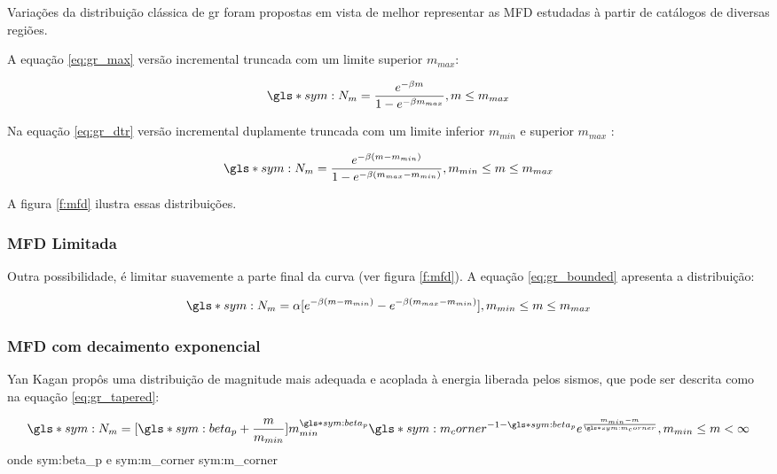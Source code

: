 Variações da distribuição clássica de \gls{gr} foram propostas em vista de melhor representar as MFD estudadas à partir de
catálogos de diversas regiões.

A equação \ref{eq:gr_max} versão incremental truncada com um limite superior $m_{max}$:

\begin{equation}
		\gls*{sym:N_m} = \frac{e^{-\beta m}}{1 -e^{-\beta m_{max}} }, m \leq m_{max}
	\label{eq:gr_max}
\end{equation}

Na equação \ref{eq:gr_dtr} versão incremental duplamente truncada com um limite inferior $m_{min}$ e superior $m_{max}$ :

\begin{equation}
		\gls*{sym:N_m} = \frac{e^{-\beta (m - m_{min})}}{1 -e^{-\beta (m_{max} - m_{min}) } } , m_{min} \leq m \leq m_{max}
	\label{eq:gr_dtr}
\end{equation}

A figura \ref{f:mfd} ilustra essas distribuições.

\subsubsection{MFD Limitada}
\label{sec:BMFD}

Outra possibilidade, é limitar suavemente a parte final da curva (ver figura \ref{f:mfd}). A equação \ref{eq:gr_bounded} apresenta
a distribuição:

\begin{equation}
		\gls*{sym:N_m} = \alpha [ e^{-\beta (m - m_{min})} - e^{-\beta (m_{max} - m_{min}) } ], m_{min} \leq m \leq m_{max}
	\label{eq:gr_bounded}
\end{equation}


\subsubsection{MFD com decaimento exponencial}
\label{sec:KMFD}

Yan Kagan \citep{kagan_2002} propôs uma distribuição de magnitude mais adequada e acoplada à energia liberada pelos sismos, que
pode ser descrita como na equação \ref{eq:gr_tapered}:

\begin{equation}\ensuremath{
		\gls*{sym:N_m} = [\gls*{sym:beta_p} + \frac{m}{m_{min}}]
				m_{min}^{\gls*{sym:beta_p}}
				\gls*{sym:m_corner}^{-1 -\gls*{sym:beta_p}}
				e^{\frac{m_{min} - m}{\gls*{sym:m_corner}}}, 
				m_{min} \leq m < \infty
		}
	\label{eq:gr_tapered}
\end{equation}
onde \glsdesc*{sym:beta_p} e \gls*{sym:m_corner} \glsdesc*{sym:m_corner}

